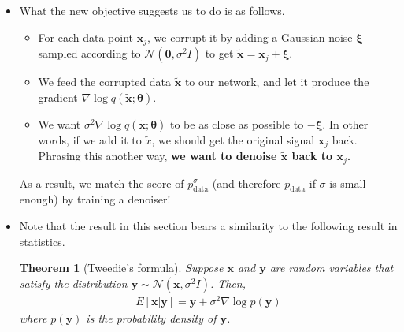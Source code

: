 \documentclass[10pt]{article}
\newtheorem{theorem}[lemma]{Theorem}
\newcommand{\ve}[1]{\mathbf{#1}}
\newcommand{\mrm}[1]{\mathrm{#1}}
\newcommand{\ves}[1]{\boldsymbol{#1}}
\newcommand{\mcal}[1]{\mathcal{#1}}
\DeclareMathOperator*{\argmin}{arg\,min}
\begin{document}
\begin{itemize}
  \begin{theorem}
    The score matching object can be recasted as a denoising objective. In other words, we have that
    \begin{align*}
      \argmin_{\ves{\theta}} J^\sigma(\ves{\theta}) = \argmin_{\ves{\theta}} \widetilde{J}^\sigma(\ves{\theta}).
    \end{align*}
    where
    \begin{align*}
      J^\sigma(\ves{\theta}) 
      &= \frac{1}{2} E_{\widetilde{\ve{x}} \sim p^\sigma_{\mrm{data}}} \Big[ \big\| \nabla \log q(\ve{x}_j + \ves{\xi};\ves{\theta}) - \ves{\Psi}^\sigma_{\mrm{data}}(\widetilde{\ve{x}}) \big\|^2 \Big], \\
      \widetilde{J}^\sigma(\ves{\theta}) &= 
      \frac{1}{2} E_{\ve{x}\sim p_{\mrm{data}},\, \widetilde{\ve{x}} \sim k(\cdot|\ve{x})} \Big[ \big\|
      \sigma^2 \nabla \log q(\ve{x}_j + \ves{\xi};\ves{\theta}) + (\widetilde{\ve{x}}-\ve{x})
      \big\|^2 \Big].
    \end{align*}
  \end{theorem}

  \item What the new objective suggests us to do is as follows.
  \begin{itemize}
    \item For each data point $\ve{x}_j$, we corrupt it by adding a Gaussian noise $\ves{\xi}$ sampled according to $\mcal{N}(\ve{0},\sigma^2I)$ to get $\widetilde{\ve{x}} = \ve{x}_j + \ves{\xi}$.
    
    \item We feed the corrupted data $\widetilde{\ve{x}}$ to our network, and let it produce the gradient $\nabla \log q(\widetilde{\ve{x}};\ves{\theta})$.
    
    \item We want $\sigma^2 \nabla \log q(\widetilde{\ve{x}};\ves{\theta})$ to be as close as possible to $-\ves{\xi}$. In other words, if we add it to $\widetilde{x}$, we should get the original signal $\ve{x}_j$ back. Phrasing this another way, {\bf we want to denoise $\widetilde{\ve{x}}$ back to $\ve{x}_j$.}
  \end{itemize}

  As a result, we match the score of $p^\sigma_{\mrm{data}}$ (and therefore $p_{\mrm{data}}$ if $\sigma$ is small enough) by training a denoiser!

  \item Note that the result in this section bears a similarity to the following result in statistics.

  \begin{theorem}[Tweedie's formula]
    Suppose $\ve{x}$ and $\ve{y}$ are random variables that satisfy the distribution $\ve{y} \sim \mcal{N}(\ve{x}, \sigma^2 I)$. Then,
    \begin{align*}
      E[\ve{x}|\ve{y}] = \ve{y} + \sigma^2 \nabla \log p(\ve{y})
    \end{align*}
    where $p(\ve{y})$ is the probability density of $\ve{y}$.
  \end{theorem}
\end{itemize}
\end{document}
